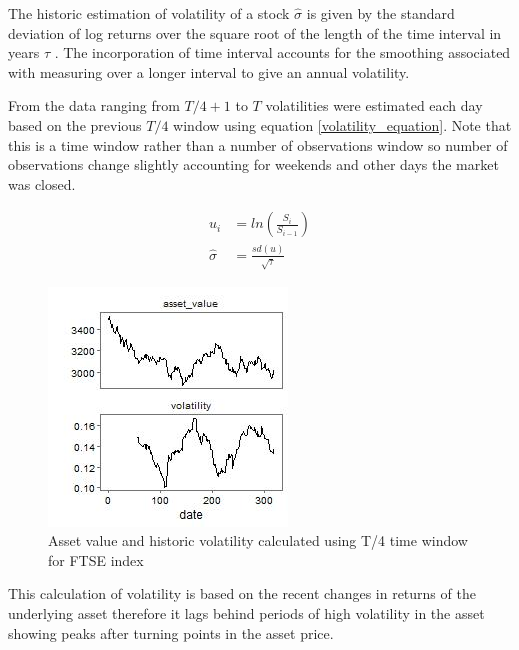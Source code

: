 \documentclass{sig-alternate-05-2015}
\begin{document}
The historic estimation of volatility of a stock $\hat{\sigma}$ is given by the standard deviation of log returns over the square root of the length of the time interval in years $\tau$ \cite{book1}. The incorporation of time interval accounts for the smoothing associated with measuring over a longer interval to give an annual volatility. 

From the data ranging from $T/4 + 1$ to $T$ volatilities were estimated each day based on the previous $T/4$ window using equation \ref{volatility_equation}. Note that this is a time window rather than a number of observations window so number of observations change slightly accounting for weekends and other days the market was closed. 

\begin{align}
u_i &= ln(\frac{S_i}{S_{i-1}}) \\
\hat{\sigma} &= \frac{sd(u)}{\sqrt{\tau}} \label{volatility_equation}
\end{align}

\begin{figure}[t]
\includegraphics[width=0.8\linewidth]{../Plots/Q2_1.jpg}
\centering
\caption{Asset value and historic volatility calculated using T/4 time window for FTSE index}
\label{fig:Q2_1}
\end{figure} 

This calculation of volatility is based on the recent changes in returns of the underlying asset therefore it lags behind periods of high volatility in the asset showing peaks after turning points in the asset price. 
\end{document}

